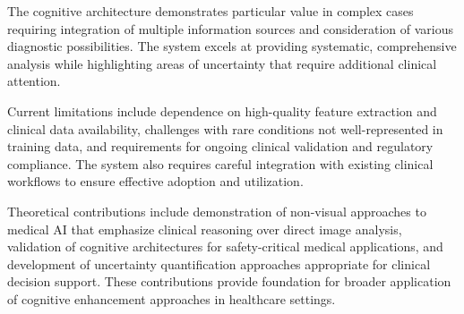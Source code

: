 The cognitive architecture demonstrates particular value in complex cases requiring integration of multiple information sources and consideration of various diagnostic possibilities. The system excels at providing systematic, comprehensive analysis while highlighting areas of uncertainty that require additional clinical attention.

Current limitations include dependence on high-quality feature extraction and clinical data availability, challenges with rare conditions not well-represented in training data, and requirements for ongoing clinical validation and regulatory compliance. The system also requires careful integration with existing clinical workflows to ensure effective adoption and utilization.

Theoretical contributions include demonstration of non-visual approaches to medical AI that emphasize clinical reasoning over direct image analysis, validation of cognitive architectures for safety-critical medical applications, and development of uncertainty quantification approaches appropriate for clinical decision support. These contributions provide foundation for broader application of cognitive enhancement approaches in healthcare settings.